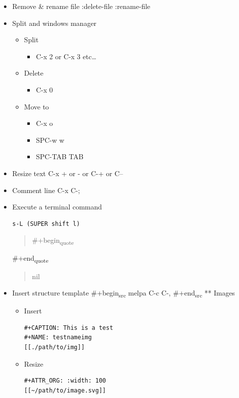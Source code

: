 \documentclass{article}
\begin{document}
\begin{itemize}
\item Remove \& rename file
\label{sec:org0675375}
:delete-file
:rename-file
\item Split and windows manager
\label{sec:org583411d}
\begin{itemize}
\item Split
\label{sec:orgfc8c507}
\begin{itemize}
\item C-x 2 or C-x 3 etc\ldots{}
\end{itemize}
\item Delete
\label{sec:orge486f85}
\begin{itemize}
\item C-x 0
\end{itemize}
\item Move to
\label{sec:orgd6a5edb}
\begin{itemize}
\item C-x o
\item SPC-w w
\item SPC-TAB TAB
\end{itemize}
\end{itemize}
\item Resize text
\label{sec:org023c269}
C-x + or - or C-+ or C--
\item Comment line
\label{sec:org17a7da2}
C-x C-;
\item Execute a terminal command
\label{sec:org44da9e9}
\begin{verbatim}
s-L (SUPER shift l)
\end{verbatim}
\begin{quote}
\#+begin\textsubscript{quote}
\end{quote}
\#+end\textsubscript{quote}
\begin{quote}
nil\end{quote}
\item Insert structure template
\label{sec:orgf06a062}
\#+begin\textsubscript{src} melpa
C-c C-,
\#+end\textsubscript{src} ** Images
\begin{itemize}
\item Insert
\label{sec:orge3a40b7}
\begin{verbatim}
#+CAPTION: This is a test
#+NAME: testnameimg
[[./path/to/img]]
\end{verbatim}
\item Resize
\label{sec:orgbe5043f}
\begin{verbatim}
#+ATTR_ORG: :width: 100
[[~/path/to/image.svg]]
\end{verbatim}
\end{itemize}

\end{itemize}
\end{document}
